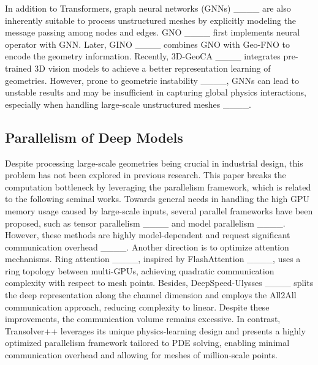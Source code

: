 In addition to Transformers, graph neural networks (GNNs) ____ are also inherently suitable to process unstructured meshes by explicitly modeling the message passing among nodes and edges. GNO ____ first implements neural operator with GNN.
Later, GINO ____ combines GNO with Geo-FNO to encode the geometry information. Recently, 3D-GeoCA ____ integrates pre-trained 3D vision models to achieve a better representation learning of geometries. However, prone to geometric instability ____, GNNs can lead to unstable results and may be insufficient in capturing global physics interactions, especially when handling large-scale unstructured meshes ____.

\subsection{Parallelism of Deep Models} 
Despite processing large-scale geometries being crucial in industrial design, this problem has not been explored in previous research. This paper breaks the computation bottleneck by leveraging the parallelism framework, which is related to the following seminal works. Towards general needs in handling the high GPU memory usage caused by large-scale inputs, several parallel frameworks have been proposed, such as tensor parallelism ____ and model parallelism ____. However, these methods are highly model-dependent and request significant communication overhead ____. Another direction is to optimize attention mechanisms. Ring attention ____, inspired by FlashAttention ____, uses a ring topology between multi-GPUs, achieving quadratic communication complexity with respect to mesh points. Besides, DeepSpeed-Ulysses ____ splits the deep representation along the channel dimension and employs the All2All communication approach, reducing complexity to linear. Despite these improvements, the communication volume remains excessive. In contrast, Transolver++ leverages its unique physics-learning design and presents a highly optimized parallelism framework tailored to PDE solving, enabling minimal communication overhead and allowing for meshes of million-scale points.